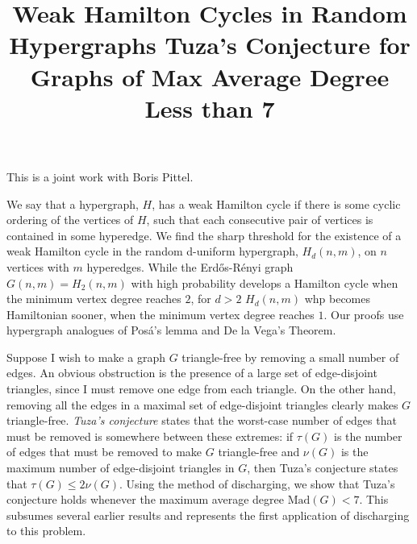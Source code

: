 \documentclass{article}
\begin{document}
This is a joint work with Boris Pittel. 



\vspace{.25in}

\title{ Weak Hamilton Cycles in Random Hypergraphs}
\endtitle
We say that a hypergraph, $H$, has a weak Hamilton cycle if there is some
cyclic ordering of the vertices of $H$, such that each consecutive pair of
vertices is contained in some hyperedge. We find the sharp threshold for the
existence of a weak Hamilton cycle in the random d-uniform hypergraph,
$H_d(n,m)$, on $n$ vertices with $m$ hyperedges. While the
Erd\H{o}s-R\'{e}nyi graph $G(n,m)=H_2(n,m)$ with high probability develops a
Hamilton cycle when the minimum vertex degree reaches $2$, for $d>2$
$H_d(n,m)$ whp becomes Hamiltonian sooner, when the minimum vertex degree
reaches $1$. Our proofs use hypergraph analogues of Pos\'{a}'s lemma and De
la Vega's Theorem. 

\vspace{.25in}

\title{  Tuza's Conjecture for Graphs of Max Average Degree Less than 7 }
\endtitle
Suppose I wish to make a graph $G$ triangle-free by removing a
small
number of edges.  An obvious obstruction is the presence of a large
set of edge-disjoint triangles, since I must remove one edge from each
triangle. On the other hand, removing all the edges in a maximal set
of edge-disjoint triangles clearly makes $G$ triangle-free.
\emph{Tuza's conjecture} states that the worst-case number of edges
that must be removed is somewhere between these extremes: if $\tau(G)$
is the number of edges that must be removed to make $G$ triangle-free
and $\nu(G)$ is the maximum number of edge-disjoint triangles in $G$,
then Tuza's conjecture states that $\tau(G) \leq 2\nu(G)$. Using the
method of discharging, we show that Tuza's conjecture holds whenever
the maximum average degree $\mathrm{Mad}(G) < 7$. This subsumes
several earlier results and represents the first application of
discharging to this problem. 



\vspace{.25in}
\end{document}
